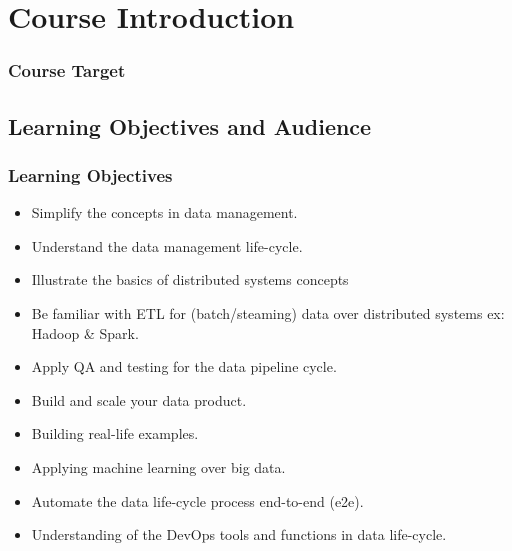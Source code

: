 \section{Course Introduction}

\begin{frame}
\frametitle{Course Target}
\scalebox{0.9}
{
	\begin{adjustbox}{max totalsize={.9\textheight},center}
	\end{adjustbox}
}
\end{frame}

\subsection{Learning Objectives and Audience}
\begin{frame}
\frametitle{Learning Objectives}

\begin{itemize}[<+->]
	\item Simplify the concepts in data management.
	\item Understand the data management life-cycle. 
	\item Illustrate the basics of distributed systems concepts 
	\item Be familiar with ETL for (batch/steaming) data over distributed systems ex: Hadoop \& Spark.  
	\item Apply QA and testing for the data pipeline cycle.
	\item Build and scale your data product. 
	\item Building real-life examples.    
	\item Applying machine learning over big data. 
	\item Automate the data life-cycle process end-to-end (e2e). 
	\item Understanding of the DevOps tools and functions in data life-cycle. 
\end{itemize}

\end{frame}


